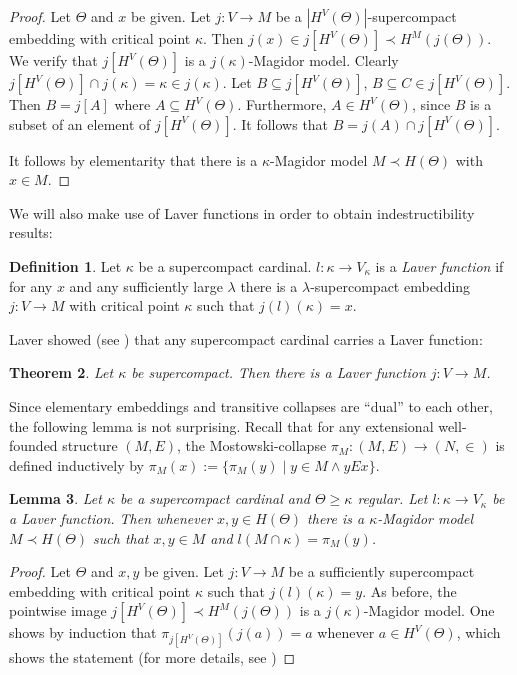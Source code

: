 \documentclass[a4paper]{amsart}
\theoremstyle{definition}
\newtheorem{mydef}{Definition}[section]
\theoremstyle{remark}
\theoremstyle{plain}
\newtheorem{mysen}[mydef]{Theorem}
\newtheorem{mylem}[mydef]{Lemma}
\numberwithin{mydef}{section}
\begin{document}
	\begin{proof}
		Let $\Theta$ and $x$ be given. Let $j\colon V\to M$ be a $|H^V(\Theta)|$-supercompact embedding with critical point $\kappa$. Then $j(x)\in j[H^V(\Theta)]\prec H^M(j(\Theta))$. We verify that $j[H^V(\Theta)]$ is a $j(\kappa)$-Magidor model. Clearly $j[H^V(\Theta)]\cap j(\kappa)=\kappa\in j(\kappa)$. Let $B\subseteq j[H^V(\Theta)]$, $B\subseteq C\in j[H^V(\Theta)]$. Then $B=j[A]$ where $A\subseteq H^V(\Theta)$. Furthermore, $A\in H^V(\Theta)$, since $B$ is a subset of an element of $j[H^V(\Theta)]$. It follows that $B=j(A)\cap j[H^V(\Theta)]$.
		
		It follows by elementarity that there is a $\kappa$-Magidor model $M\prec H(\Theta)$ with $x\in M$.
	\end{proof}
	
	We will also make use of Laver functions in order to obtain indestructibility results:
	
	\begin{mydef}
		Let $\kappa$ be a supercompact cardinal. $l\colon\kappa\to V_{\kappa}$ is a \emph{Laver function} if for any $x$ and any sufficiently large $\lambda$ there is a $\lambda$-supercompact embedding $j\colon V\to M$ with critical point $\kappa$ such that $j(l)(\kappa)=x$.
	\end{mydef}
	
	Laver showed (see \cite{LaverIndestruct}) that any supercompact cardinal carries a Laver function:
	
	\begin{mysen}
		Let $\kappa$ be supercompact. Then there is a Laver function $j\colon V\to M$.
	\end{mysen}
	
	Since elementary embeddings and transitive collapses are ``dual'' to each other, the following lemma is not surprising. Recall that for any extensional well-founded structure $(M,E)$, the Mostowski-collapse $\pi_M\colon(M,E)\to(N,\in)$ is defined inductively by $\pi_M(x):=\{\pi_M(y)\;|\;y\in M\wedge yEx\}$.
	
	\begin{mylem}\label{SmallLaver}
		Let $\kappa$ be a supercompact cardinal and $\Theta\geq\kappa$ regular. Let $l\colon\kappa\to V_{\kappa}$ be a Laver function. Then whenever $x,y\in H(\Theta)$ there is a $\kappa$-Magidor model $M\prec H(\Theta)$ such that $x,y\in M$ and $l(M\cap\kappa)=\pi_M(y)$.
	\end{mylem}
	
	\begin{proof}
		Let $\Theta$ and $x,y$ be given. Let $j\colon V\to M$ be a sufficiently supercompact embedding with critical point $\kappa$ such that $j(l)(\kappa)=y$. As before, the pointwise image $j[H^V(\Theta)]\prec H^M(j(\Theta))$ is a $j(\kappa)$-Magidor model. One shows by induction that $\pi_{j[H^V(\Theta)]}(j(a))=a$ whenever $a\in H^V(\Theta)$, which shows the statement (for more details, see \cite[Lemma 5.4.14]{JakobPhD})
	\end{proof}
	
\end{document}

